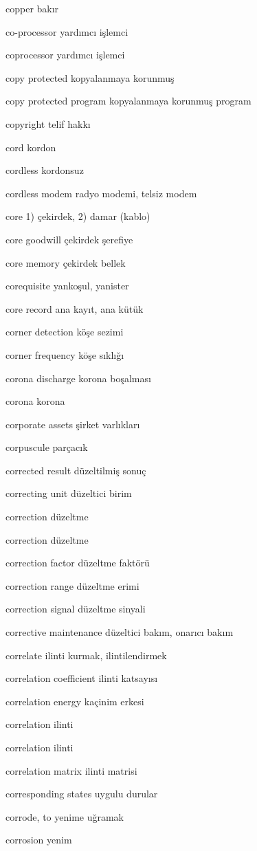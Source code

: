 \documentclass[12pt,fleqn]{article}\usepackage{../../common}
\begin{document}
copper bakır

co-processor yardımcı işlemci

coprocessor yardımcı işlemci

copy protected kopyalanmaya korunmuş

copy protected program kopyalanmaya korunmuş program

copyright telif hakkı

cord kordon

cordless kordonsuz

cordless modem radyo modemi, telsiz modem

core 1) çekirdek, 2) damar (kablo)

core goodwill çekirdek şerefiye

core memory çekirdek bellek

corequisite yankoşul, yanister

core record ana kayıt, ana kütük

corner detection köşe sezimi

corner frequency köşe sıklığı

corona discharge korona boşalması

corona korona

corporate assets şirket varlıkları

corpuscule parçacık

corrected result düzeltilmiş sonuç

correcting unit düzeltici birim

correction düzeltme

correction düzeltme

correction factor düzeltme faktörü

correction range düzeltme erimi

correction signal düzeltme sinyali

corrective maintenance düzeltici bakım, onarıcı bakım

correlate ilinti kurmak, ilintilendirmek

correlation coefficient ilinti katsayısı

correlation energy kaçinim erkesi

correlation ilinti

correlation ilinti

correlation matrix ilinti matrisi

corresponding states uygulu durular

corrode, to yenime uğramak

corrosion yenim
\end{document}
